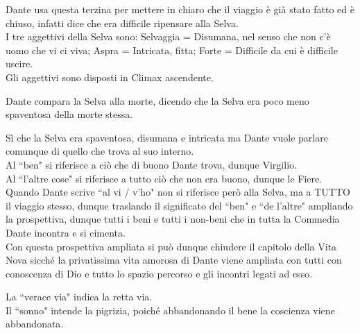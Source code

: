 \documentclass{article}
\begin{document}
Dante usa questa terzina per mettere in chiaro che il viaggio è già stato fatto ed è chiuso, infatti dice che era difficile ripensare alla Selva.\\
I tre aggettivi della Selva sono: Selvaggia = Disumana, nel senso che non c'è uomo che vi ci viva; Aspra = Intricata, fitta; Forte = Difficile da cui è difficile uscire.\\
Gli aggettivi sono disposti in Climax ascendente.


Dante compara la Selva alla morte, dicendo che la Selva era poco meno spaventosa della morte stessa.


Sì che la Selva era spaventosa, disumana e intricata ma Dante vuole parlare comunque di quello che trova al suo interno.\\
Al ``ben" si riferisce a ciò che di buono Dante trova, dunque Virgilio.\\
Al ``l'altre cose" si riferisce a tutto ciò che non era buono, dunque le Fiere.\\
Quando Dante scrive ``al vi / v'ho" non si riferisce però alla Selva, ma a TUTTO il viaggio stesso, dunque traslando il significato del ``ben" e ``de l'altre" ampliando la prospettiva, dunque tutti i beni e tutti i non-beni che in tutta la Commedia Dante incontra e si cimenta.\\
Con questa prospettiva ampliata si può dunque chiudere il capitolo della Vita Nova sicché la privatissima vita amorosa di Dante viene ampliata con tutti con conoscenza di Dio e tutto lo spazio percorso e gli incontri legati ad esso.


La ``verace via" indica la retta via.\\
Il ``sonno" intende la pigrizia, poiché abbandonando il bene la coscienza viene abbandonata.

\end{document}
